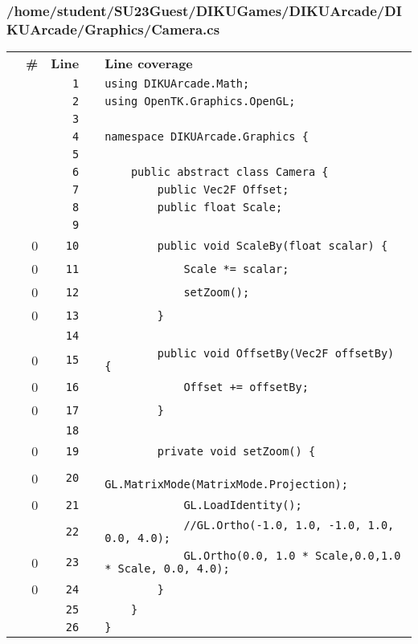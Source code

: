 \documentclass[a4paper,landscape,10pt]{article}
\begin{document}
\subsubsection{/home/student/SU23Guest/DIKUGames/DIKUArcade/DIKUArcade/Graphics/Camera.cs}
\begin{longtable}[l]{lrrll}
\textbf{} & \textbf{\#} & \textbf{Line} & \textbf{} & \textbf{Line coverage}\\
\cellcolor{gray} &  & \verb~1~ & & \verb~using DIKUArcade.Math;~\\
\cellcolor{gray} &  & \verb~2~ & & \verb~using OpenTK.Graphics.OpenGL;~\\
\cellcolor{gray} &  & \verb~3~ & & \verb~~\\
\cellcolor{gray} &  & \verb~4~ & & \verb~namespace DIKUArcade.Graphics {~\\
\cellcolor{gray} &  & \verb~5~ & & \verb~~\\
\cellcolor{gray} &  & \verb~6~ & & \verb~    public abstract class Camera {~\\
\cellcolor{gray} &  & \verb~7~ & & \verb~        public Vec2F Offset;~\\
\cellcolor{gray} &  & \verb~8~ & & \verb~        public float Scale;~\\
\cellcolor{gray} &  & \verb~9~ & & \verb~~\\
\cellcolor{red} & 0 & \verb~10~ & & \verb~        public void ScaleBy(float scalar) {~\\
\cellcolor{red} & 0 & \verb~11~ & & \verb~            Scale *= scalar;~\\
\cellcolor{red} & 0 & \verb~12~ & & \verb~            setZoom();~\\
\cellcolor{red} & 0 & \verb~13~ & & \verb~        }~\\
\cellcolor{gray} &  & \verb~14~ & & \verb~~\\
\cellcolor{red} & 0 & \verb~15~ & & \verb~        public void OffsetBy(Vec2F offsetBy) {~\\
\cellcolor{red} & 0 & \verb~16~ & & \verb~            Offset += offsetBy;~\\
\cellcolor{red} & 0 & \verb~17~ & & \verb~        }~\\
\cellcolor{gray} &  & \verb~18~ & & \verb~~\\
\cellcolor{red} & 0 & \verb~19~ & & \verb~        private void setZoom() {~\\
\cellcolor{red} & 0 & \verb~20~ & & \verb~            GL.MatrixMode(MatrixMode.Projection);~\\
\cellcolor{red} & 0 & \verb~21~ & & \verb~            GL.LoadIdentity();~\\
\cellcolor{gray} &  & \verb~22~ & & \verb~            //GL.Ortho(-1.0, 1.0, -1.0, 1.0, 0.0, 4.0);~\\
\cellcolor{red} & 0 & \verb~23~ & & \verb~            GL.Ortho(0.0, 1.0 * Scale,0.0,1.0 * Scale, 0.0, 4.0);~\\
\cellcolor{red} & 0 & \verb~24~ & & \verb~        }~\\
\cellcolor{gray} &  & \verb~25~ & & \verb~    }~\\
\cellcolor{gray} &  & \verb~26~ & & \verb~}~\\
\end{longtable}
\newpage
\end{document}
